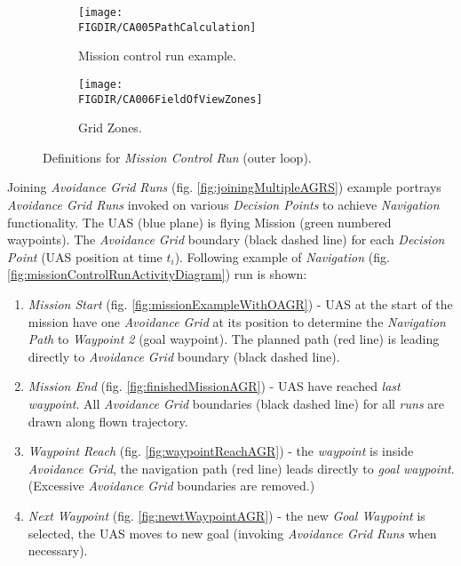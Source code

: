 \begin{figure}[H]
    \centering
    \begin{subfigure}{0.48\textwidth}
        \centering
        \texttt{[image: \\FIGDIR/CA005PathCalculation]}
        \caption{Mission control run example.}
        \label{fig:missionControlRunExample}
    \end{subfigure}
    \begin{subfigure}{0.48\textwidth}
    	\centering
        \texttt{[image: \\FIGDIR/CA006FieldOfViewZones]} 
        \caption{Grid Zones.}
        \label{fig:gridZonesMissionControl}
    \end{subfigure}
    \caption{Definitions for \emph{Mission Control Run} (outer loop).}
    \label{fig:definitionsForMissionControlRun}
\end{figure}

\newpage
\noindent Joining \emph{Avoidance Grid Runs} (fig. \ref{fig:joiningMultipleAGRS})  example portrays \emph{Avoidance Grid Runs} invoked on various \emph{Decision Points} to achieve \emph{Navigation} functionality. The UAS (blue plane) is flying Mission (green numbered waypoints). The \emph{Avoidance Grid} boundary (black dashed line) for each \emph{Decision Point} (UAS position at time $t_i$). Following example of \emph{Navigation} (fig. \ref{fig:missionControlRunActivityDiagram}) run is shown:

\begin{enumerate}
    \item \emph{Mission Start} (fig. \ref{fig:missionExampleWithOAGR}) - UAS at the start of the mission have one \emph{Avoidance Grid} at its position to determine the \emph{Navigation Path} to \emph{Waypoint 2} (goal waypoint). The planned path (red line) is leading directly to \emph{Avoidance Grid} boundary (black dashed line).
    
    \item \emph{Mission End} (fig. \ref{fig:finishedMissionAGR}) - UAS have reached 
    \emph{last waypoint}. All \emph{Avoidance Grid} boundaries (black dashed line) for all \emph{runs} are drawn along flown trajectory. 
    
    \item \emph{Waypoint Reach} (fig. \ref{fig:waypointReachAGR}) - the \emph{waypoint} is inside \emph{Avoidance Grid}, the navigation path (red line) leads directly to \emph{goal waypoint}. (Excessive \emph{Avoidance Grid} boundaries are removed.)
    
    \item \emph{Next Waypoint} (fig. \ref{fig:newtWaypointAGR}) - the new \emph{Goal Waypoint} is selected, the UAS moves to new goal (invoking \emph{Avoidance Grid Runs} when necessary).
    
\end{enumerate}


